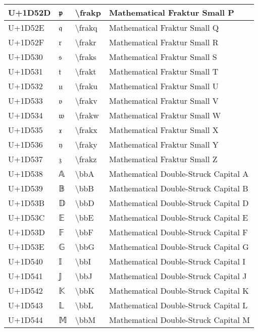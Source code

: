 \begin{table}[h]
\begin{tabulary}{\linewidth}{|L|L|L|L|}
\hline
U+1D52D & 𝔭 & {\textbackslash}frakp & Mathematical Fraktur Small P \\
\hline
U+1D52E & 𝔮 & {\textbackslash}frakq & Mathematical Fraktur Small Q \\
\hline
U+1D52F & 𝔯 & {\textbackslash}frakr & Mathematical Fraktur Small R \\
\hline
U+1D530 & 𝔰 & {\textbackslash}fraks & Mathematical Fraktur Small S \\
\hline
U+1D531 & 𝔱 & {\textbackslash}frakt & Mathematical Fraktur Small T \\
\hline
U+1D532 & 𝔲 & {\textbackslash}fraku & Mathematical Fraktur Small U \\
\hline
U+1D533 & 𝔳 & {\textbackslash}frakv & Mathematical Fraktur Small V \\
\hline
U+1D534 & 𝔴 & {\textbackslash}frakw & Mathematical Fraktur Small W \\
\hline
U+1D535 & 𝔵 & {\textbackslash}frakx & Mathematical Fraktur Small X \\
\hline
U+1D536 & 𝔶 & {\textbackslash}fraky & Mathematical Fraktur Small Y \\
\hline
U+1D537 & 𝔷 & {\textbackslash}frakz & Mathematical Fraktur Small Z \\
\hline
U+1D538 & 𝔸 & {\textbackslash}bbA & Mathematical Double-Struck Capital A \\
\hline
U+1D539 & 𝔹 & {\textbackslash}bbB & Mathematical Double-Struck Capital B \\
\hline
U+1D53B & 𝔻 & {\textbackslash}bbD & Mathematical Double-Struck Capital D \\
\hline
U+1D53C & 𝔼 & {\textbackslash}bbE & Mathematical Double-Struck Capital E \\
\hline
U+1D53D & 𝔽 & {\textbackslash}bbF & Mathematical Double-Struck Capital F \\
\hline
U+1D53E & 𝔾 & {\textbackslash}bbG & Mathematical Double-Struck Capital G \\
\hline
U+1D540 & 𝕀 & {\textbackslash}bbI & Mathematical Double-Struck Capital I \\
\hline
U+1D541 & 𝕁 & {\textbackslash}bbJ & Mathematical Double-Struck Capital J \\
\hline
U+1D542 & 𝕂 & {\textbackslash}bbK & Mathematical Double-Struck Capital K \\
\hline
U+1D543 & 𝕃 & {\textbackslash}bbL & Mathematical Double-Struck Capital L \\
\hline
U+1D544 & 𝕄 & {\textbackslash}bbM & Mathematical Double-Struck Capital M \\

\end{tabulary}
\end{table}
